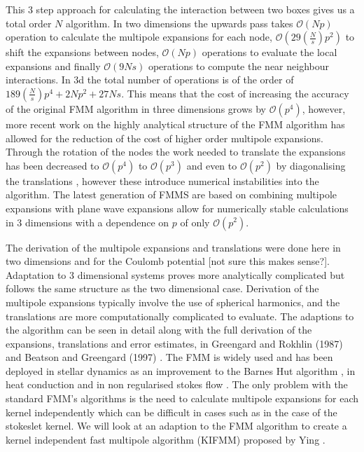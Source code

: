 This 3 step approach for calculating the interaction between two boxes gives us a total order $N$ algorithm. In two dimensions the upwards pass takes $\mathcal{O}(Np)$ operation to calculate the multipole expansions for each node, $\mathcal{O}(29 \left(\frac{N}{s}\right) p^2)$ to shift the expansions between nodes, $\mathcal{O}(Np)$ operations to evaluate the local expansions and finally $\mathcal{O}(9Ns)$ operations to compute the near neighbour interactions. In 3d the total number of operations is of the order of $189\left(\frac{N}{s}\right)p^4 + 2Np^2 + 27Ns$. This means that the cost of increasing the accuracy of the original FMM algorithm in three dimensions grows by $\mathcal{O}(p^4)$, however, more recent work on the highly analytical structure of the FMM algorithm has allowed for the reduction of the cost of higher order multipole expansions. Through the rotation of the nodes the work needed to translate the expansions has been decreased to $\mathcal{O}(p^4)$ to $\mathcal{O}(p^3)$ \cite{Greengard1997ADimensions,Hrycak1998AnFields} and even to $\mathcal{O}(p^2)$ by diagonalising the translations \cite{Berman2006Grid-MultipoleCalculations,Elliott1996FastAlgorithm}, however these introduce numerical instabilities into the algorithm. The latest generation of FMMS are based on combining multipole expansions with plane wave expansions \cite{Greengard1997ADimensions,Hrycak1998AnFields} allow for numerically stable calculations in 3 dimensions with a dependence on $p$ of only $\mathcal{O}(p^2)$. 

The derivation of the multipole expansions and translations were done here in two dimensions and for the Coulomb potential [not sure this makes sense?]. Adaptation to 3 dimensional systems proves more analytically complicated but follows the same structure as the two dimensional case. Derivation of the multipole expansions typically involve the use of spherical harmonics, and the translations are more computationally complicated to evaluate. The adaptions to the algorithm can be seen in detail along with the full derivation of the expansions, translations and error estimates, in Greengard and Rokhlin (1987) \cite{Greengard1987ASimulations} and Beatson and Greengard (1997) \cite{Beatson}. The FMM is widely used and has been deployed in stellar dynamics as an improvement to the Barnes Hut algorithm \cite{Dehnen2014ADynamics}, in heat conduction \cite{Watschinger2021AEquation} and in non regularised stokes flow \cite{Selmi2007FastComplexity,Tornberg2008}. The only problem with the standard FMM's algorithms is the need to calculate multipole expansions for each kernel independently which can be difficult in cases such as in the case of the stokeslet kernel. We will look at an adaption to the FMM algorithm to create a kernel independent fast multipole algorithm (KIFMM) proposed by Ying \cite{Ying2004,Ying2005}.


